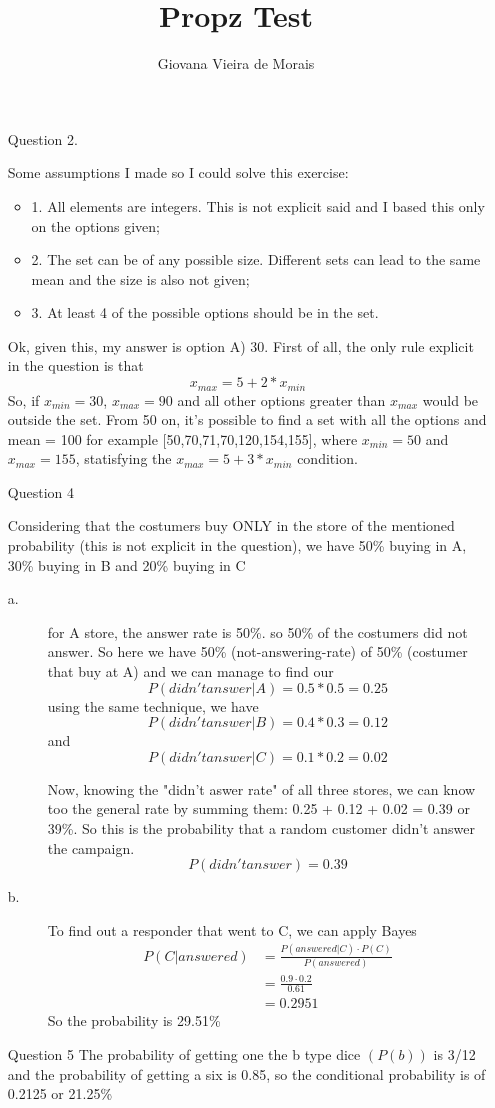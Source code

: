 \documentclass{article}
\title{Propz Test}
\author{Giovana Vieira de Morais}
\begin{document}
\maketitle

\begin{enumerate}
  \item[Question 2.]{
    Some assumptions I made so I could solve this exercise:
    \begin{itemize}
      \item{1. All elements are integers. This is not explicit said and I
        based this only on the options given;}
      \item{2. The set can be of any possible size. Different sets can lead to
        the same mean and the size is also not given;}
      \item{3. At least 4 of the possible options should be in the set.}
    \end{itemize}
    Ok, given this, my answer is option A) 30.
    First of all, the only rule explicit in the question is that
		$$ x_{max} = 5 + 2*x_{min} $$
		So, if $x_{min} = 30$, $x_{max} = 90$ and all other options greater than
    $x_{max}$ would be outside the set.
    From 50 on, it's possible to find a set with all the options and mean = 100
    for example [50,70,71,70,120,154,155], where $x_{min} = 50$ and
    $x_{max} = 155$, statisfying the $x_{max} = 5 + 3*x_{min}$ condition.
  }

  \item[Question 4]{
    Considering that the costumers buy ONLY in the store of the mentioned
    probability (this is not explicit in the question), we have
    50\% buying in A, 30\% buying in B and 20\% buying in C

    \begin{description}
      \item[a.]{
        for A store, the answer rate is 50\%. so 50\% of the costumers
        did not answer. So here we have 50\% (not-answering-rate) of 50\%
        (costumer that buy at A) and we can manage to find our
        $$ P(didn't answer|A) = 0.5*0.5 = 0.25 $$
        using the same technique, we have
        $$P(didn't answer|B) = 0.4*0.3 = 0.12$$
        and $$P(didn't answer|C) = 0.1*0.2 = 0.02$$

        Now, knowing the "didn't aswer rate" of all three stores, we can
        know too the general rate by summing them: 0.25 + 0.12 + 0.02 = 0.39
        or 39\%. So this is the probability that a random customer didn't
        answer the campaign.
        $$P(didn't answer) = 0.39$$
      }
      \item[b.]{
        To find out a responder that went to C, we can apply Bayes
        \begin{align*}
          P(C|answered) &= \frac{P(answered|C) \cdot P(C)}{P(answered)} \\
                        &= \frac{0.9 \cdot 0.2}{0.61} \\
                        &= 0.2951
        \end{align*}
        So the probability is 29.51\%
    }
    \end{description}
  }

  \item[Question 5]{
    The probability of getting one the b type dice $(P(b))$ is 3/12 and the
    probability of getting a six is 0.85, so the conditional probability is of
    0.2125 or 21.25\%
  }
\end{enumerate}
\end{document}
